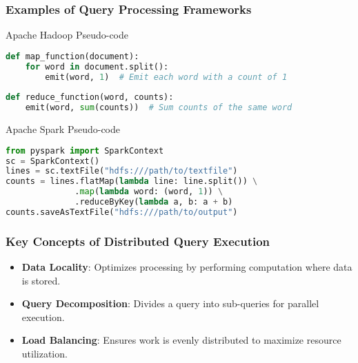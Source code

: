 \documentclass[aspectratio=169]{beamer}
\begin{document}
\begin{frame}[fragile]
    \frametitle{Examples of Query Processing Frameworks}
    \begin{block}{Apache Hadoop Pseudo-code}
    \begin{lstlisting}[language=Python]
def map_function(document):
    for word in document.split():
        emit(word, 1)  # Emit each word with a count of 1
        
def reduce_function(word, counts):
    emit(word, sum(counts))  # Sum counts of the same word
    \end{lstlisting}
    \end{block}

    \begin{block}{Apache Spark Pseudo-code}
    \begin{lstlisting}[language=Python]
from pyspark import SparkContext
sc = SparkContext()
lines = sc.textFile("hdfs:///path/to/textfile")
counts = lines.flatMap(lambda line: line.split()) \
              .map(lambda word: (word, 1)) \
              .reduceByKey(lambda a, b: a + b)
counts.saveAsTextFile("hdfs:///path/to/output")
    \end{lstlisting}
    \end{block}
\end{frame}

\begin{frame}
    \frametitle{Key Concepts of Distributed Query Execution}
    \begin{itemize}
        \item \textbf{Data Locality}: Optimizes processing by performing computation where data is stored.
        \item \textbf{Query Decomposition}: Divides a query into sub-queries for parallel execution.
        \item \textbf{Load Balancing}: Ensures work is evenly distributed to maximize resource utilization.
    \end{itemize}
\end{frame}
\end{document}

